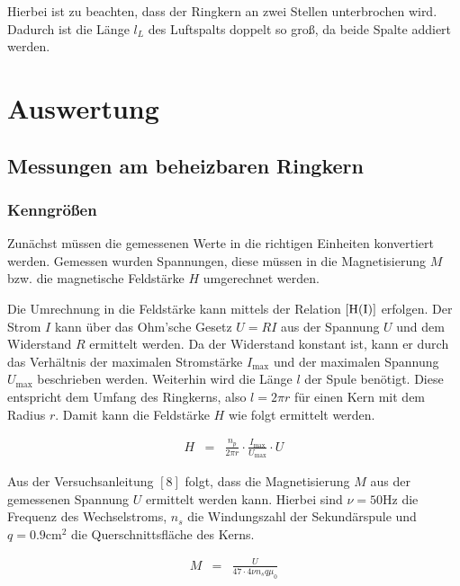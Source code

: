 \documentclass[12pt,a4paper]{scrartcl}
\numberwithin{equation}{section} %
\newcommand{\pu}[1]{\ensuremath{\mathrm{#1}}}
\renewcommand{\[}{} %
\renewcommand{\]}{\noindent} %
\begin{document}
Hierbei ist zu beachten, dass der Ringkern an zwei Stellen unterbrochen
wird. Dadurch ist die Länge \(l_L\) des Luftspalts doppelt so groß, da
beide Spalte addiert werden.

\hypertarget{auswertung}{%
\section{Auswertung}\label{auswertung}}

\hypertarget{messungen-am-beheizbaren-ringkern}{%
\subsection{Messungen am beheizbaren
Ringkern}\label{messungen-am-beheizbaren-ringkern}}

\hypertarget{kenngruxf6uxdfen}{%
\subsubsection{Kenngrößen}\label{kenngruxf6uxdfen}}

Zunächst müssen die gemessenen Werte in die richtigen Einheiten
konvertiert werden. Gemessen wurden Spannungen, diese müssen in die
Magnetisierung \(M\) bzw. die magnetische Feldstärke \(H\) umgerechnet
werden.

Die Umrechnung in die Feldstärke kann mittels der Relation
\(\eqref{H(I)}\) erfolgen. Der Strom \(I\) kann über das Ohm'sche Gesetz
\(U=RI\) aus der Spannung \(U\) und dem Widerstand \(R\) ermittelt
werden. Da der Widerstand konstant ist, kann er durch das Verhältnis der
maximalen Stromstärke \(I_\mathrm{max}\) und der maximalen Spannung
\(U_\mathrm{max}\) beschrieben werden. Weiterhin wird die Länge \(l\)
der Spule benötigt. Diese entspricht dem Umfang des Ringkerns, also
\(l=2\pi r\) für einen Kern mit dem Radius \(r\). Damit kann die
Feldstärke \(H\) wie folgt ermittelt werden.

\[
\begin{eqnarray}
    H &=&
        \frac{n_p}{2\pi r} \cdot \frac{I_\mathrm{max}}{U_\mathrm{max}} \cdot U
        \label{H}
\end{eqnarray}
\]

Aus der Versuchsanleitung \([8]\) folgt, dass die Magnetisierung \(M\)
aus der gemessenen Spannung \(U\) ermittelt werden kann. Hierbei sind
\(\nu=\pu{50 Hz}\) die Frequenz des Wechselstroms, \(n_s\) die
Windungszahl der Sekundärspule und \(q = \pu{0.9 cm^2}\) die
Querschnittsfläche des Kerns.

\[
\begin{eqnarray}
    M &=&
        \frac{U}{47\cdot 4\nu n_s q \mu_0}
        \label{M}
\end{eqnarray}
\]
\end{document}
